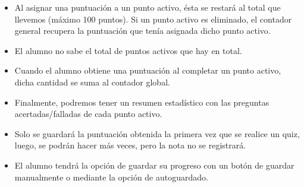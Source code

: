 \documentclass[12pt,letterpaper]{article}
\begin{document}
\begin{itemize}
\begin{itemize}
		\item Al asignar una puntuación a un punto activo, ésta se restará al total que llevemos (máximo 100 puntos). Si un punto activo es eliminado, el contador general recupera la puntuación que tenía asignada dicho punto activo.
		\item El alumno no sabe el total de puntos activos que hay en total.
		\item Cuando el alumno obtiene una puntuación al completar un punto activo, dicha cantidad se suma al contador global.
		\item Finalmente, podremos tener un resumen estadístico con las preguntas acertadas/falladas de cada punto activo.
		\item Solo se guardará la puntuación obtenida la primera vez que se realice un quiz, luego, se podrán hacer más veces, pero la nota no se registrará.
		\item El alumno tendrá la opción de guardar su progreso con un botón de guardar manualmente o mediante la opción de autoguardado.
	\end{itemize}
\end{itemize}
\end{document}
